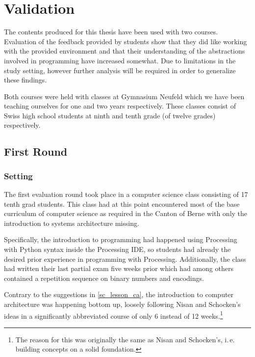
\chapter{Validation} \label{ch_practice}

The contents produced for this thesis have been used with two courses. Evaluation of the feedback provided by students show that they did like working with the provided environment and that their understanding of the abstractions involved in programming have increased somewhat. Due to limitations in the study setting, however further analysis will be required in order to generalize these findings.

Both courses were held with classes at Gymnasium Neufeld which we have been teaching ourselves for one and two years respectively. These classes consist of Swiss high school students at ninth and tenth grade (of twelve grades) respectively.


\section{First Round} \label{sc_validation_ca} %

\subsection{Setting}

The first evaluation round took place in a computer science class consisting of 17 tenth grad students. This class had at this point encountered most of the base curriculum of computer science as required in the Canton of Berne \cite[p.\,145--146]{Erz16} with only the introduction to systems architecture missing.

Specifically, the introduction to programming had happened using Processing with Python syntax inside the Processing \ac{IDE}, so students had already the desired prior experience in programming with Processing. Additionally, the class had written their last partial exam five weeks prior which had among others contained a repetition sequence on binary numbers and encodings.

Contrary to the suggestions in \ref{sc_lesson_ca}, the introduction to computer architecture was happening bottom up, loosely following Nisan and Schocken's ideas \cite{Nis21} in a significantly abbreviated course of only 6 instead of 12 weeks.\footnote{The reason for this was originally the same as Nisan and Schocken's, i.\,e. building concepts on a solid foundation.}

